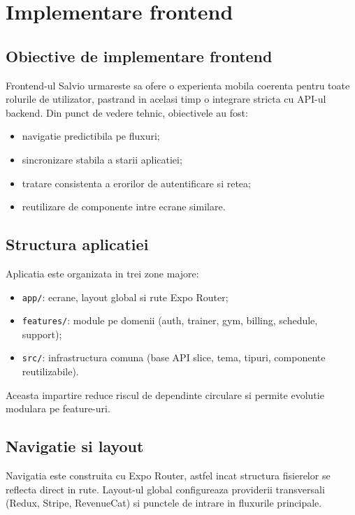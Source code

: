\chapter{Implementare frontend}

\section{Obiective de implementare frontend}

Frontend-ul Salvio urmareste sa ofere o experienta mobila coerenta pentru toate rolurile de utilizator, pastrand in acelasi timp o integrare stricta cu API-ul backend. Din punct de vedere tehnic, obiectivele au fost:
\begin{itemize}[leftmargin=1.2cm]
    \item navigatie predictibila pe fluxuri;
    \item sincronizare stabila a starii aplicatiei;
    \item tratare consistenta a erorilor de autentificare si retea;
    \item reutilizare de componente intre ecrane similare.
\end{itemize}

\section{Structura aplicatiei}

Aplicatia este organizata in trei zone majore:
\begin{itemize}[leftmargin=1.2cm]
    \item \texttt{app/}: ecrane, layout global si rute Expo Router;
    \item \texttt{features/}: module pe domenii (auth, trainer, gym, billing, schedule, support);
    \item \texttt{src/}: infrastructura comuna (base API slice, tema, tipuri, componente reutilizabile).
\end{itemize}

Aceasta impartire reduce riscul de dependinte circulare si permite evolutie modulara pe feature-uri.

\section{Navigatie si layout}

Navigatia este construita cu Expo Router, astfel incat structura fisierelor se reflecta direct in rute. Layout-ul global configureaza providerii transversali (Redux, Stripe, RevenueCat) si punctele de intrare in fluxurile principale.

